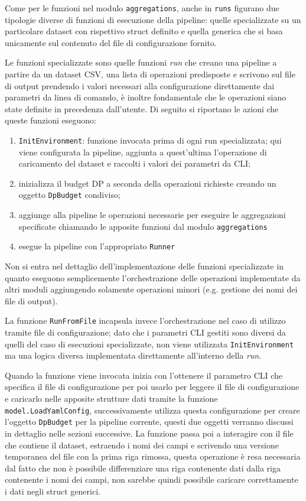 Come per le funzioni nel modulo \texttt{aggregations}, anche in \texttt{runs} figurano due tipologie diverse di funzioni di esecuzione della pipeline: quelle specializzate su un particolare dataset con rispettivo struct definito e quella generica che si basa unicamente sul contenuto del file di configurazione fornito.

Le funzioni specializzate sono quelle funzioni \textit{run} che creano una pipeline a partire da un dataset CSV, una lista di operazioni predisposte e scrivono sul file di output prendendo i valori necessari alla configurazione direttamente dai parametri da linea di comando, è inoltre fondamentale che le operazioni siano state definite in precedenza dall'utente. Di seguito si riportano le azioni che queste funzioni eseguono:
\begin{enumerate}
    \item \texttt{InitEnvironment}: funzione invocata prima di ogni run specializzata; qui viene configurata la pipeline, aggiunta a quest'ultima l'operazione di caricamento del dataset e raccolti i valori dei parametri da CLI;
    \item inizializza il budget DP a seconda della operazioni richieste creando un oggetto \texttt{DpBudget} condiviso;
    \item aggiunge alla pipeline le operazioni necessarie per eseguire le aggregazioni specificate chiamando le apposite funzioni dal modulo \texttt{aggregations}
    \item esegue la pipeline con l'appropriato \texttt{Runner}
\end{enumerate}
Non si entra nel dettaglio dell'implementazione delle funzioni specializzate in quanto eseguono semplicemente l'orchestrazione delle operazioni implementate da altri moduli aggiungendo solamente operazioni minori (e.g. gestione dei nomi dei file di output).

La funzione \texttt{RunFromFile} incapsula invece l'orchestrazione nel caso di utilizzo tramite file di configurazione; dato che i parametri CLI gestiti sono diversi da quelli del caso di esecuzioni specializzate, non viene utilizzata \texttt{InitEnvironment} ma una logica diversa implementata direttamente all'interno della \textit{run}.

Quando la funzione viene invocata inizia con l'ottenere il parametro CLI che specifica il file di configurazione per poi usarlo per leggere il file di configurazione e caricarlo nelle apposite strutture dati tramite la funzione \texttt{model.LoadYamlConfig}, successivamente utilizza questa configurazione per creare l'oggetto \texttt{DpBudget} per la pipeline corrente, questi due oggetti verranno discussi in dettaglio nelle sezioni successive. La funzione passa poi a interagire con il file che contiene il dataset, estraendo i nomi dei campi e scrivendo una versione temporanea del file con la prima riga rimossa, questa operazione è resa necessaria dal fatto che non è possibile differenziare una riga contenente dati dalla riga contenente i nomi dei campi, non sarebbe quindi possibile caricare correttamente i dati negli struct generici.

